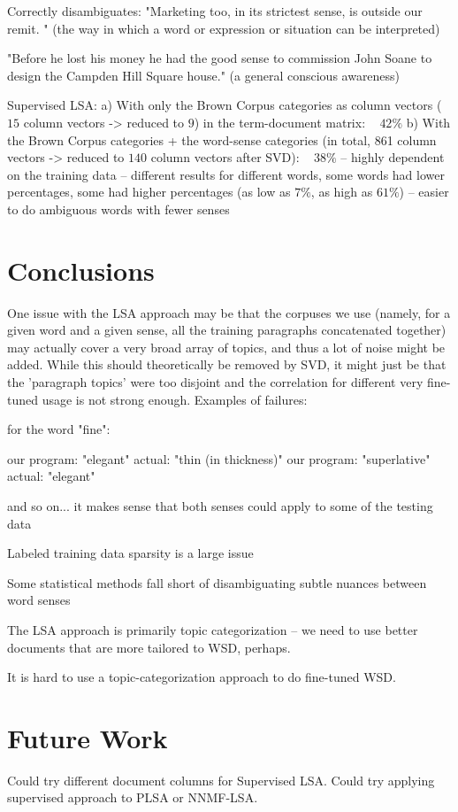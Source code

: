 \documentclass[10pt, letterpaper]{article}
\begin{document}
	Correctly disambiguates:
	"Marketing too, in its strictest sense, is outside our remit. " (the way in which a word or expression or situation can be interpreted)	

	"Before he lost his money he had the good sense to commission John Soane to design the Campden Hill Square house." (a general conscious awareness)

	Supervised LSA: 
	a) With only the Brown Corpus categories as column vectors ($15$ column vectors -> reduced to $9$) in the term-document matrix: ~ $42\%$
	b) With the Brown Corpus categories + the word-sense categories (in total, 861 column vectors -> reduced to $140$ column vectors after SVD): ~ $38\%$
	-- highly dependent on the training data -- different results for different words, some words had lower percentages, some had higher percentages (as low as $7\%$, as high as $61\%$)
	-- easier to do ambiguous words with fewer senses

	\section{Conclusions}
	One issue with the LSA approach may be that the corpuses we use (namely, for a given word and a given sense, all the training paragraphs concatenated together) may actually cover a very broad array of topics, and thus a lot of noise might be added. While this should theoretically be removed by SVD, it might just be that the 'paragraph topics' were too disjoint and the correlation for different very fine-tuned usage is not strong enough. 
	Examples of failures: 

	for the word "fine": 	

	our program: "elegant"  actual: "thin (in thickness)"
	our program: "superlative" actual: "elegant" 	

	and so on... it makes sense that both senses could apply to some of the testing data

	Labeled training data sparsity is a large issue

	Some statistical methods fall short of disambiguating subtle nuances between word senses	

	The LSA approach is primarily topic categorization -- we need to use better documents that are more tailored to WSD, perhaps. 	

	It is hard to use a topic-categorization approach to do fine-tuned WSD. 

	\section{Future Work}
	Could try different document columns for Supervised LSA.
	Could try applying supervised approach to PLSA or NNMF-LSA.	
\end{document}
